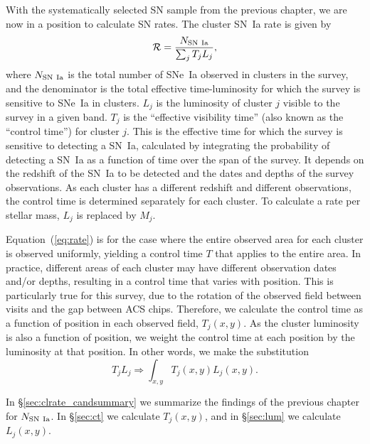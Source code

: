 
With the systematically selected SN sample from the previous chapter,
we are now in a position to calculate SN rates. The cluster SN~Ia rate
is given by
\begin{equation}
\label{eq:rate}
\mathcal{R} = \frac{N_{\rm SN~Ia}}{\sum_j T_j L_j} ,
\end{equation}
where $N_{\rm SN~Ia}$ is the total number of SNe~Ia observed in
clusters in the survey, and the denominator is the total effective
time-luminosity for which the survey is sensitive to SNe~Ia in
clusters. $L_j$ is the luminosity of cluster $j$ visible to the survey
in a given band. $T_j$ is the ``effective visibility time'' (also
known as the ``control time'') for cluster $j$. This is the effective
time for which the survey is sensitive to detecting a SN~Ia,
calculated by integrating the probability of detecting a SN~Ia as a
function of time over the span of the survey. It depends on the
redshift of the SN~Ia to be detected and the dates and depths of the
survey observations. As each cluster has a different redshift and
different observations, the control time is determined separately for
each cluster.  To calculate a rate per stellar mass, $L_j$ is replaced
by $M_j$.

Equation~(\ref{eq:rate}) is for the case where the entire observed
area for each cluster is observed uniformly, yielding a control time
$T$ that applies to the entire area.  In practice, different areas of
each cluster may have different observation dates and/or depths,
resulting in a control time that varies with position. This is
particularly true for this survey, due to the rotation of the observed
field between visits and the gap between ACS chips. Therefore, we
calculate the control time as a function of position in each observed
field, $T_j(x,y)$. As the cluster luminosity is also a function of
position, we weight the control time at each position by the
luminosity at that position. In other words, we make the substitution
\begin{equation} 
\label{eq:ratedenom}
T_j L_j \Rightarrow \int_{x,y} T_j (x,y) L_j (x,y). 
\end{equation}

In \S\ref{sec:clrate_candsummary} we summarize the findings of the
previous chapter for $N_{\rm SN~Ia}$.  In \S\ref{sec:ct} we calculate
$T_j (x,y)$, and in \S\ref{sec:lum} we calculate $L_j(x,y)$.

